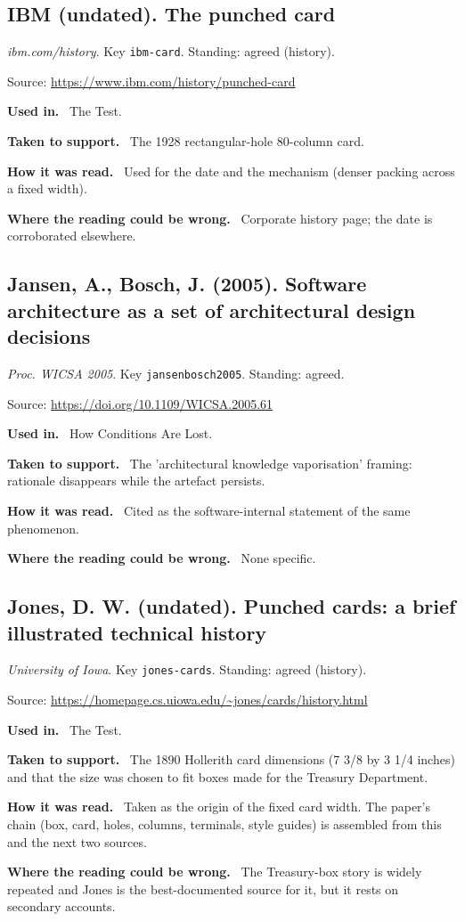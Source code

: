 \documentclass[11pt,oneside]{article}
\newcommand{\field}[1]{\par\noindent\textbf{\color{accent}#1.}\ }
\begin{document}
\hypertarget{src:ibm-card}{}
\subsection*{IBM (undated). The punched card}
\noindent\small\emph{ibm.com/history}. Key \texttt{ibm-card}. Standing: agreed (history).
\par\noindent\small Source: \url{https://www.ibm.com/history/punched-card}
\normalsize
\field{Used in} The Test.
\field{Taken to support} The 1928 rectangular-hole 80-column card.
\field{How it was read} Used for the date and the mechanism (denser packing across a fixed width).
\field{Where the reading could be wrong} Corporate history page; the date is corroborated elsewhere.

\hypertarget{src:jansenbosch2005}{}
\subsection*{Jansen, A., Bosch, J. (2005). Software architecture as a set of architectural design decisions}
\noindent\small\emph{Proc. WICSA 2005}. Key \texttt{jansenbosch2005}. Standing: agreed.
\par\noindent\small Source: \url{https://doi.org/10.1109/WICSA.2005.61}
\normalsize
\field{Used in} How Conditions Are Lost.
\field{Taken to support} The 'architectural knowledge vaporisation' framing: rationale disappears while the artefact persists.
\field{How it was read} Cited as the software-internal statement of the same phenomenon.
\field{Where the reading could be wrong} None specific.

\hypertarget{src:jones-cards}{}
\subsection*{Jones, D. W. (undated). Punched cards: a brief illustrated technical history}
\noindent\small\emph{University of Iowa}. Key \texttt{jones-cards}. Standing: agreed (history).
\par\noindent\small Source: \url{https://homepage.cs.uiowa.edu/~jones/cards/history.html}
\normalsize
\field{Used in} The Test.
\field{Taken to support} The 1890 Hollerith card dimensions (7 3/8 by 3 1/4 inches) and that the size was chosen to fit boxes made for the Treasury Department.
\field{How it was read} Taken as the origin of the fixed card width. The paper's chain (box, card, holes, columns, terminals, style guides) is assembled from this and the next two sources.
\field{Where the reading could be wrong} The Treasury-box story is widely repeated and Jones is the best-documented source for it, but it rests on secondary accounts.
\end{document}
